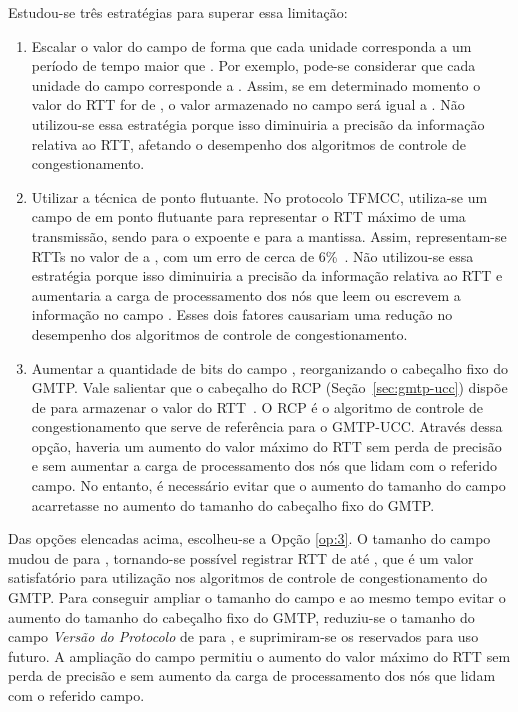Estudou-se três estratégias para superar essa limitação:
\begin{enumerate} 
	\item Escalar o valor do campo  de forma que cada unidade corresponda a um período de tempo maior que . Por exemplo, pode-se considerar que cada unidade do campo  corresponde a . Assim, se em determinado momento o valor do RTT for de , o valor armazenado no campo  será igual a .
	Não utilizou-se essa estratégia porque isso diminuiria a precisão da informação relativa ao RTT, afetando o desempenho dos algoritmos de controle de congestionamento.
	
	\item Utilizar a técnica de ponto flutuante. No protocolo TFMCC, utiliza-se um campo de  em ponto flutuante para representar o RTT máximo de uma transmissão, sendo  para o expoente e  para a mantissa. Assim, representam-se RTTs no valor de  a , com um erro de cerca de 6\%~\cite{widmer2006tcp}.
	Não utilizou-se essa estratégia porque isso diminuiria a precisão da informação relativa ao RTT e aumentaria a carga de processamento dos nós que leem ou escrevem a informação no campo . Esses dois fatores causariam uma redução no desempenho dos algoritmos de controle de congestionamento.
	
	\item Aumentar a quantidade de bits do campo , reorganizando o cabeçalho fixo do GMTP.
	\label{op:3}
	Vale salientar que o cabeçalho do RCP (Seção~\ref{sec:gmtp-ucc}) dispõe de  para armazenar o valor do RTT~\cite{dukkipati2007rate}. O RCP é o algoritmo de controle de congestionamento que serve de referência para o GMTP-UCC.
	Através dessa opção, haveria um aumento do valor máximo do RTT sem perda de precisão e sem aumentar a carga de processamento dos nós que lidam com o referido campo. No entanto, é necessário evitar que o aumento do tamanho do campo acarretasse no aumento do tamanho do cabeçalho fixo do GMTP.
\end{enumerate}

Das opções elencadas acima, escolheu-se a Opção \ref{op:3}.
O tamanho do campo  mudou de  para , tornando-se possível registrar RTT de até , que é um valor satisfatório para utilização nos algoritmos de controle de congestionamento do GMTP. 
Para conseguir ampliar o tamanho do campo  e ao mesmo tempo evitar o aumento do tamanho do cabeçalho fixo do GMTP, reduziu-se o tamanho do campo \textit{Versão do Protocolo} de  para , e suprimiram-se os  reservados para uso futuro.
A ampliação do campo  permitiu o aumento do valor máximo do RTT sem perda de precisão e sem aumento da carga de processamento dos nós que lidam com o referido campo.

